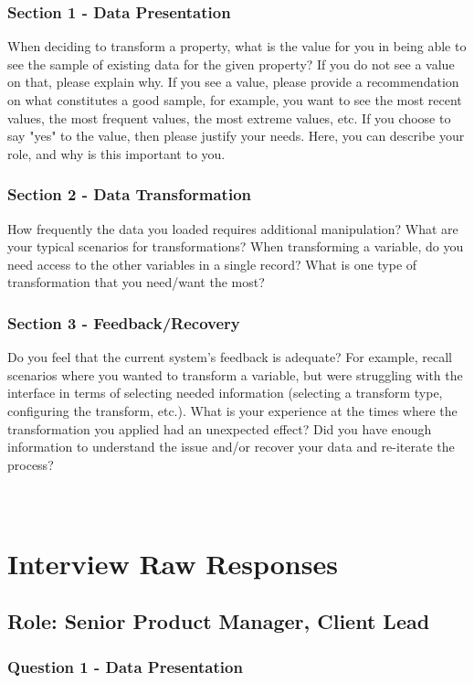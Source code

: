 \documentclass[12pt,letterpaper]{article}
\begin{document}
\subsubsection*{Section 1 - Data Presentation}
When deciding to transform a property, what is the value for you in being able to see the sample of existing data for the given property? If you do not see a value on that, please explain why.  If you see a value, please provide a recommendation on what constitutes a good sample, for example, you want to see the most recent values, the most frequent values, the most extreme values, etc. If you choose to say "yes" to the value, then please justify your needs. Here, you can describe your role, and why is this important to you.  

\subsubsection*{Section 2 - Data Transformation}
How frequently the data you loaded requires additional manipulation? What are your typical scenarios for transformations? When transforming a variable, do you need access to the other variables in a single record? What is one type of transformation that you need/want the most?  

\subsubsection*{Section 3 - Feedback/Recovery}
Do you feel that the current system's feedback is adequate? For example, recall scenarios where you wanted to transform a variable, but were struggling with the interface in terms of selecting needed information (selecting a transform type, configuring the transform, etc.). What is your experience at the times where the transformation you applied had an unexpected effect? Did you have enough information to understand the issue and/or recover your data and re-iterate the process?

\section{\\Interview Raw Responses}

\subsection*{Role: Senior Product Manager, Client Lead}
\subsubsection*{Question 1 - Data Presentation} 
\end{document}
